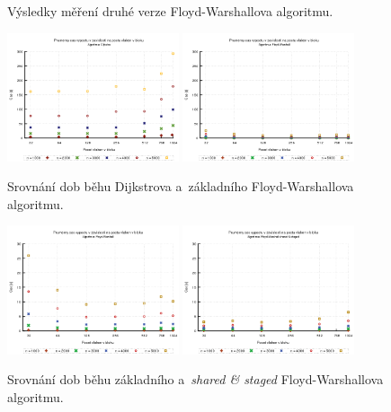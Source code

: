 \begin{figure}
    \centering
    \caption{Výsledky měření druhé verze Floyd-Warshallova algoritmu.}
    \label{f:cuda:vysledky:fw-v2}
\end{figure}


\begin{figure}
    \centering
    \includegraphics[width=0.45\textwidth]{../grafy/03_cuda/03-01-Dijkstra_cas}
    \includegraphics[width=0.45\textwidth]{../grafy/03_cuda/03-01-Floyd_v1_cas}
    \caption{Srovnání dob běhu Dijkstrova a~základního Floyd-Warshallova algoritmu.}
    \label{f:mer:cuda:cas1}
\end{figure}

\begin{figure}
    \centering
    \includegraphics[width=0.45\textwidth]{../grafy/03_cuda/03-01-Floyd_v1_cas_zoom}
    \includegraphics[width=0.45\textwidth]{../grafy/03_cuda/03-01-Floyd_v2_cas}
    \caption{Srovnání dob běhu základního a~\emph{shared \& staged} Floyd-Warshallova algoritmu.}
    \label{f:mer:cuda:cas2}
\end{figure}

